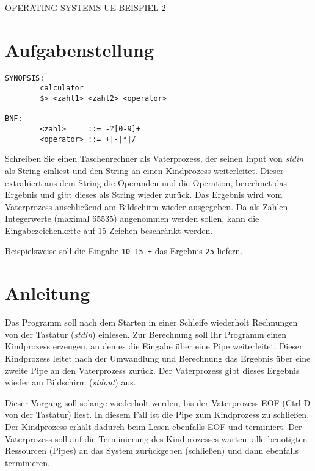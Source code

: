 \documentclass{article}
\begin{document}
\begin{center}
\begin{Large}
OPERATING SYSTEMS UE BEISPIEL 2
\end{Large}
\end{center}




\section*{Aufgabenstellung}

\begin{verbatim}
SYNOPSIS:
        calculator
        $> <zahl1> <zahl2> <operator>

BNF:
        <zahl>     ::= -?[0-9]+
        <operator> ::= +|-|*|/

\end{verbatim}

Schreiben Sie einen Taschenrechner als Vaterprozess, der seinen Input
von \emph{stdin} als String einliest und den String an einen
Kindprozess weiterleitet. Dieser extrahiert aus dem String die
Operanden und die Operation, berechnet das Ergebnis und gibt dieses
als String wieder zurück. Das Ergebnis wird vom Vaterprozess
anschließend am Bildschirm wieder ausgegeben. Da als Zahlen
Integerwerte (maximal 65535) angenommen werden sollen, kann die
Eingabezeichenkette auf 15 Zeichen beschränkt werden.


Beispielsweise soll die Eingabe \verb_10 15 +_ das Ergebnis \verb_25_
liefern.

\section*{Anleitung}

Das Programm soll nach dem Starten in einer Schleife wiederholt
Rechnungen von der Tastatur (\emph{stdin}) einlesen. Zur
Berechnung soll Ihr Programm einen Kindprozess erzeugen, an den
es die Eingabe über eine Pipe weiterleitet. Dieser Kindprozess
leitet nach der Umwandlung und Berechnung das Ergebnis über eine
zweite Pipe an den Vaterprozess zurück. Der Vaterprozess
gibt dieses Ergebnis wieder am Bildschirm (\emph{stdout}) aus.


Dieser Vorgang soll solange wiederholt werden, bis der Vaterprozess
EOF (Ctrl-D von der Tastatur) liest. In diesem Fall ist die Pipe zum
Kindprozess zu schließen. Der Kindprozess erhält dadurch beim Lesen
ebenfalls EOF und terminiert. Der Vaterprozess soll auf die
Terminierung des Kindprozesses warten, alle benötigten Ressourcen
(Pipes) an das System zurückgeben (schließen) und dann ebenfalls
terminieren.
\end{document}
